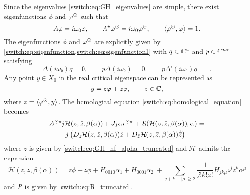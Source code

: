 Since the eigenvalues \cref{switch:eq:GH_eigenvalues} are simple, there exist eigenfunctions $\phi$ and $\varphi^{\odot}$ such that
\[
A\varphi=i\omega_{0}\varphi, \qquad A^{\star}\varphi^{\odot}=i\omega_{0}\varphi^{\odot}, \qquad \langle \varphi^{\odot},\varphi \rangle_{} = 1.
\]
The eigenfunctions $\phi$ and $\varphi^{\odot}$ are explicitly given by \cref{switch:eq:eigenfunction,switch:eq:eigenfunction1} with $q\in \mathbb{C}^n$ and $p \in \mathbb{C}^{n\star}$ satisfying
\[
\Delta(i\omega_{0})q=0, \qquad p\Delta(i\omega_{0})=0, \qquad p\Delta'(i\omega_0)q = 1.
\]
Any point $y\in X_{0}$ in the real critical eigenspace can be represented as
\[
y=z\varphi+\bar{z}\bar{\varphi},\qquad z\in \mathbb{C},
\]
where $z=\langle \varphi^{\odot},y \rangle_{}$. The homological equation \cref{switch:eq:homological_equation} becomes
\begin{multline}
  \label{switch:eq:homological_equationGH}
  A^{\odot\star}j\mathcal{H}(z,\bar{z},\beta(\alpha))+J_{1}\alpha r^{\odot\star} +R(\mathcal{H}(z,\bar{z},\beta(\alpha)),\alpha) =\\
  j\left(D_{z}\mathcal{H}(z,\bar{z},\beta(\alpha))\dot{z}+D_{\bar{z}}\mathcal{H}(z,\bar{z},\beta(\alpha))\dot{\bar{z}} \right),
\end{multline}
where $\dot{z}$ is given by \cref{switch:eq:GH_nf_alpha_truncated} and $\mathcal{H}$ admits the expansion
\begin{equation}
  \label{switch:eq:GH_H}
  \mathcal{H}(z,\bar{z},\beta(\alpha)) = z\phi+\bar{z}\bar{\phi} + H_{0010}\alpha_1 +H_{0001}\alpha_2~
  +\sum_{j+k+|\mu| \geq 2}\dfrac{1}{j!k!\mu!}H_{jk\mu}z^{j}\bar{z}^{k}\alpha^{\mu}
\end{equation}
and $R$ is given by \cref{switch:eq:R_truncated}.

